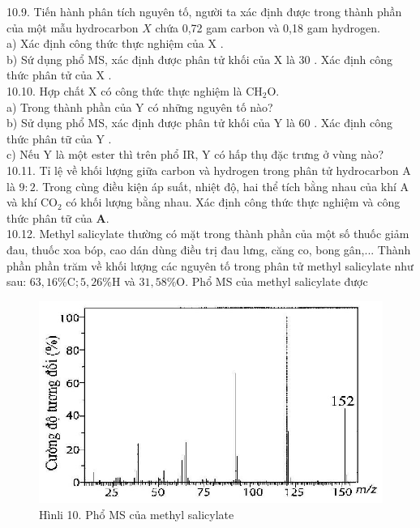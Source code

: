 \documentclass[10pt]{article}
\begin{document}
10.9. Tiến hành phân tích nguyên tố, người ta xác định được trong thành phần của một mẫu hydrocarbon $X$ chứa 0,72 gam carbon và 0,18 gam hydrogen.\\
a) Xác định công thức thực nghiệm của X .\\
b) Sứ dụng phổ MS, xác định được phân tử khối của X là 30 . Xác định công thức phân tử của X .\\
10.10. Hợp chất X có công thức thực nghiệm là $\mathrm{CH}_{2} \mathrm{O}$.\\
a) Trong thành phần của Y có những nguyên tố nào?\\
b) Sử dụng phổ MS, xác định được phân tử khối của Y là 60 . Xác định công thức phân tữ của Y .\\
c) Nếu Y là một ester thì trên phổ IR, Y có hấp thụ đặc trưng ở vùng nào?\\
10.11. Tỉ lệ về khối lượng giữa carbon và hydrogen trong phân tử hydrocarbon A là $9: 2$. Trong cùng điều kiện áp suất, nhiệt độ, hai thể tích bằng nhau của khí A và khí $\mathrm{CO}_{2}$ có khối lượng bằng nhau. Xác định công thức thực nghiệm và công thức phân tữ của $\mathbf{A}$.\\
10.12. Methyl salicylate thường có mặt trong thành phần của một số thuốc giảm đau, thuốc xoa bóp, cao dán dùng điều trị đau lưng, căng co, bong gân,... Thành phần phần trăm về khối lượng các nguyên tố trong phân tử methyl salicylate như sau: $63,16 \% \mathrm{C} ; 5,26 \% \mathrm{H}$ và $31,58 \% \mathrm{O}$. Phổ MS của methyl salicylate được

\begin{figure}[h]
\begin{center}
  \includegraphics[width=\textwidth]{2025_10_23_f2823ef970776205e47bg-32}
\captionsetup{labelformat=empty}
\caption{Hìnli 10. Phổ MS của methyl salicylate}
\end{center}
\end{figure}
\end{document}

